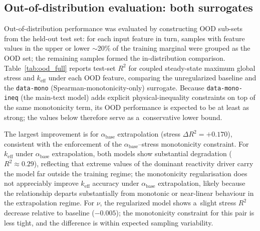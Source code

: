 \documentclass[pdflatex,sn-mathphys-num]{sn-jnl}
\theoremstyle{thmstyleone}
\theoremstyle{thmstyletwo}
\theoremstyle{thmstylethree}
\begin{document}
\begin{appendices}

\section{Out-of-distribution evaluation: both surrogates}\label{sec:appendix_ood}

Out-of-distribution performance was evaluated by constructing OOD sub-sets from the
held-out test set: for each input feature in turn, samples with feature values in
the upper or lower $\sim$20\% of the training marginal were grouped as the OOD set;
the remaining samples formed the in-distribution comparison.
Table~\ref{tab:ood_full} reports test-set $R^2$ for coupled steady-state maximum global stress and
$k_{\mathrm{eff}}$ under each OOD feature, comparing the unregularized baseline and
the \texttt{data-mono} (Spearman-monotonicity-only) surrogate.
Because \texttt{data-mono-ineq} (the main-text model) adds explicit
physical-inequality constraints on top of the same monotonicity term, its OOD
performance is expected to be at least as strong; the values below therefore
serve as a~conservative lower bound.

The largest improvement is for $\alpha_{\mathrm{base}}$ extrapolation
(stress $\Delta R^2 = +0.170$), consistent with the enforcement of the
$\alpha_{\mathrm{base}}$--stress monotonicity constraint.
For $k_{\mathrm{eff}}$ under $\alpha_{\mathrm{base}}$ extrapolation, both models
show substantial degradation ($R^2 \approx 0.29$), reflecting that extreme values of
the dominant reactivity driver carry the model far outside the training regime;
the monotonicity regularisation does not appreciably improve
$k_{\mathrm{eff}}$ accuracy under $\alpha_{\mathrm{base}}$ extrapolation,
likely because the relationship departs substantially from monotonic or
near-linear behaviour in the extrapolation regime.
For $\nu$, the regularized model shows a~slight stress $R^2$ decrease relative to
baseline ($-0.005$); the monotonicity constraint for this pair is less tight,
and the difference is within expected sampling variability.


\end{appendices}
\end{document}
